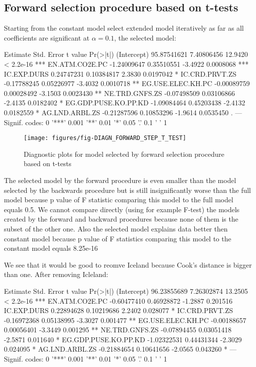 \documentclass[a4paper]{article}
\begin{document}
\subsection{Forward selection procedure based on t-tests}
Starting from the constant model select extended model iteratively as far as all
coefficients are significant at $\alpha=0.1$, the selected model:
\begin{Schunk}
\begin{Soutput}
                        Estimate  Std. Error t value  Pr(>|t|)    
(Intercept)          95.87541621  7.40806456 12.9420 < 2.2e-16 ***
EN.ATM.CO2E.PC       -1.24009647  0.35510551 -3.4922 0.0008068 ***
IC.EXP.DURS           0.24747231  0.10384817  2.3830 0.0197042 *  
IC.CRD.PRVT.ZS       -0.17788245  0.05226977 -3.4032 0.0010718 ** 
EG.USE.ELEC.KH.PC    -0.00089759  0.00028492 -3.1503 0.0023430 ** 
NE.TRD.GNFS.ZS       -0.07498509  0.03106866 -2.4135 0.0182402 *  
EG.GDP.PUSE.KO.PP.KD -1.09084464  0.45203438 -2.4132 0.0182559 *  
AG.LND.ARBL.ZS       -0.21287596  0.10853296 -1.9614 0.0535450 .  
---
Signif. codes:  0 '***' 0.001 '**' 0.01 '*' 0.05 '.' 0.1 ' ' 1
\end{Soutput}
\end{Schunk}

\begin{figure}[H]
\begin{center}
\texttt{[image: figures/fig-DIAGN\_FORWARD\_STEP\_T\_TEST]}
\caption{Diagnostic plots for model selected by forward selection procedure based
on t-tests}
\end{center}
\end{figure}
The selected model by the forward procedure is even smaller than the model
selected by the backwards procedure but is still insignificantly worse than the
full model because p value of F statistic comparing this model to the full
model equals
0.5. We cannot compare directly (using for example F-test) the models created by the forward and backward procedures because none of them is the subset of the other one. Also the selected model explains data better then
constant model because p value of F statistics comparing this model to the
constant model equals
8.25e-16

We see that it would be good to reomve Iceland because Cook's distance is bigger
than one. After removing Icleland:

\begin{Schunk}
\begin{Soutput}
                        Estimate  Std. Error t value  Pr(>|t|)    
(Intercept)          96.23855689  7.26302874 13.2505 < 2.2e-16 ***
EN.ATM.CO2E.PC       -0.60477410  0.46928872 -1.2887  0.201516    
IC.EXP.DURS           0.22894628  0.10219686  2.2402  0.028077 *  
IC.CRD.PRVT.ZS       -0.16972368  0.05138995 -3.3027  0.001477 ** 
EG.USE.ELEC.KH.PC    -0.00188657  0.00056401 -3.3449  0.001295 ** 
NE.TRD.GNFS.ZS       -0.07894455  0.03051418 -2.5871  0.011640 *  
EG.GDP.PUSE.KO.PP.KD -1.02322531  0.44431344 -2.3029  0.024095 *  
AG.LND.ARBL.ZS       -0.21884654  0.10641656 -2.0565  0.043260 *  
---
Signif. codes:  0 '***' 0.001 '**' 0.01 '*' 0.05 '.' 0.1 ' ' 1
\end{Soutput}
\end{Schunk}
\end{document}
